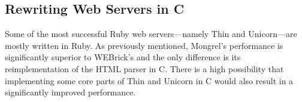 \subsection{Rewriting Web Servers in C}
Some of the most successful Ruby web servers---namely Thin and Unicorn---are mostly written in Ruby. As previously mentioned, Mongrel's performance is significantly superior to WEBrick's and the only difference is its reimplementation of the HTML parser in C. There is a high possibility that implementing some core parts of Thin and Unicorn in C would also result in a significantly improved performance.

